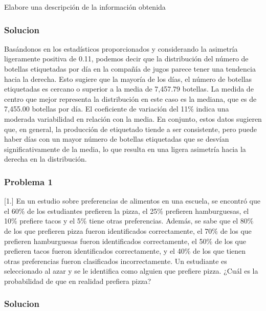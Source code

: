 \documentclass[
]{article}
\begin{document}
Elabore una descripción de la información obtenida

\hypertarget{solucion-1}{%
\subsubsection{\texorpdfstring{\textbf{Solucion}}{Solucion}}\label{solucion-1}}

Basándonos en los estadísticos proporcionados y considerando la
asimetría ligeramente positiva de 0.11, podemos decir que la
distribución del número de botellas etiquetadas por día en la compañía
de jugos parece tener una tendencia hacia la derecha. Esto sugiere que
la mayoría de los días, el número de botellas etiquetadas es cercano o
superior a la media de 7,457.79 botellas. La medida de centro que mejor
representa la distribución en este caso es la mediana, que es de
7,455.00 botellas por día. El coeficiente de variación del 11\% indica
una moderada variabilidad en relación con la media. En conjunto, estos
datos sugieren que, en general, la producción de etiquetado tiende a ser
consistente, pero puede haber días con un mayor número de botellas
etiquetadas que se desvían significativamente de la media, lo que
resulta en una ligera asimetría hacia la derecha en la distribución.

\hypertarget{problema-1-1}{%
\subsubsection{Problema 1}\label{problema-1-1}}

{[}1.{]} En un estudio sobre preferencias de alimentos en una escuela,
se encontró que el 60\% de los estudiantes prefieren la pizza, el 25\%
prefieren hamburguesas, el 10\% prefiere tacos y el 5\% tiene otras
preferencias. Además, se sabe que el 80\% de los que prefieren pizza
fueron identificados correctamente, el 70\% de los que prefieren
hamburguesas fueron identificados correctamente, el 50\% de los que
prefieren tacos fueron identificados correctamente, y el 40\% de los que
tienen otras preferencias fueron clasificados incorrectamente. Un
estudiante es seleccionado al azar y se le identifica como alguien que
prefiere pizza. ¿Cuál es la probabilidad de que en realidad prefiera
pizza?

\hypertarget{solucion-2}{%
\subsubsection{\texorpdfstring{\textbf{Solucion}}{Solucion}}\label{solucion-2}}
\end{document}
